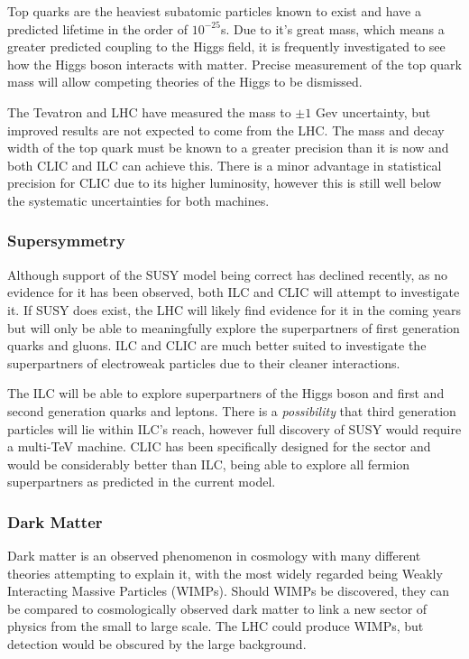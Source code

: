 Top quarks are the heaviest subatomic particles known to exist and have a predicted lifetime in the order of $10^{-25}$s. Due to it's great mass, which means a greater predicted coupling to the Higgs field, it is frequently investigated to see how the Higgs boson interacts with matter. Precise measurement of the top quark mass will allow competing theories of the Higgs to be dismissed.

The Tevatron and LHC have measured the mass to $\pm 1$ Gev uncertainty, but improved results are not expected to come from the LHC. The mass and decay width of the top quark must be known to a greater precision than it is now and both CLIC and ILC can achieve this. There is a minor advantage in statistical precision for CLIC due to its higher luminosity, however this is still well below the systematic uncertainties for both machines. \cite{CERN:TopQuark, CLIC:TopQuark}

\subsubsection{Supersymmetry}

Although support of the SUSY model being correct has declined recently, as no evidence for it has been observed, both ILC and CLIC will attempt to investigate it. If SUSY does exist, the LHC will likely find evidence for it in the coming years but will only be able to meaningfully explore the superpartners of first generation quarks and gluons. ILC and CLIC are much better suited to investigate the superpartners of electroweak particles due to their cleaner interactions.

The ILC will be able to explore superpartners of the Higgs boson and first and second generation quarks and leptons. There is a {\em possibility} that third generation particles will lie within ILC's reach, however full discovery of SUSY would require a multi-TeV machine. CLIC has been specifically designed for the sector and would be considerably better than ILC, being able to explore all fermion superpartners as predicted in the current model. \cite{CLIC:Concept}

\subsubsection{Dark Matter}

Dark matter is an observed phenomenon in cosmology with many different theories attempting to explain it, with the most widely regarded being Weakly Interacting Massive Particles (WIMPs). Should WIMPs be discovered, they can be compared to cosmologically observed dark matter to link a new sector of physics from the small to large scale. The LHC could produce WIMPs, but detection would be obscured by the large background.

